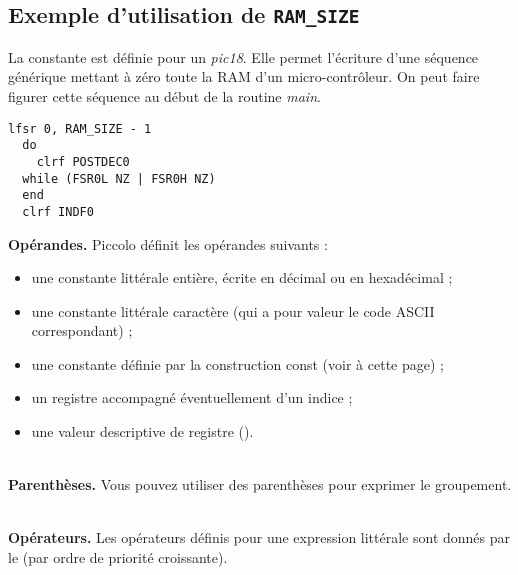 \subsection{Exemple d'utilisation de \texttt{RAM\_SIZE}}

La constante  est définie pour un \emph{pic18}. Elle permet l'écriture d'une séquence générique mettant à zéro toute la RAM d'un micro-contrôleur. On peut faire figurer cette séquence au début de la routine \emph{main}.


\begin{lstlisting}[language=piccolo]
  lfsr 0, RAM_SIZE - 1
  do
    clrf POSTDEC0
  while (FSR0L NZ | FSR0H NZ)
  end
  clrf INDF0
\end{lstlisting}



\textbf{Opérandes.} Piccolo définit les opérandes suivants :
\begin{itemize}
  \item une constante littérale entière, écrite en décimal ou en hexadécimal ;
  \item une constante littérale caractère (qui a pour valeur le code ASCII correspondant) ;
  \item une constante définie par la construction const (voir à cette page) ;
  \item un registre accompagné éventuellement d’un indice ;
  \item une valeur descriptive de registre ().
\end{itemize}

~\\
\textbf{Parenthèses.} Vous pouvez utiliser des parenthèses pour exprimer le groupement.

~\\
\textbf{Opérateurs.} Les opérateurs définis pour une expression littérale sont donnés par le  (par ordre de priorité croissante).

